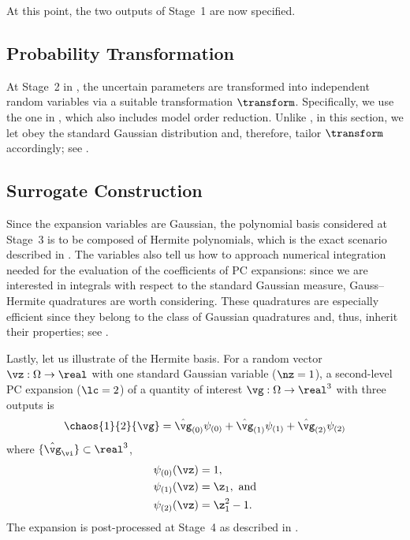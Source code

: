 At this point, the two outputs of Stage~1 are now specified.

\subsection{Probability Transformation}

At Stage~2 in , the uncertain parameters \vu are
transformed into independent random variables \vz via a suitable transformation
$\transform$. Specifically, we use the one in ,
which also includes model order reduction. Unlike
, in this section, we let \vz obey the
standard Gaussian distribution and, therefore, tailor $\transform$ accordingly;
see .

\subsection{Surrogate Construction}

Since the expansion variables \vz are Gaussian, the polynomial basis considered
at Stage~3 is to be composed of Hermite polynomials, which is the exact scenario
described in . The variables also tell us how to approach
numerical integration needed for the evaluation of the coefficients of \ac{PC}
expansions: since we are interested in integrals with respect to the standard
Gaussian measure, Gauss--Hermite quadratures \cite{maitre2010} are worth
considering. These quadratures are especially efficient since they belong to the
class of Gaussian quadratures and, thus, inherit their properties; see
.

Lastly, let us illustrate of the Hermite basis. For a random vector $\vz: \Omega
\to \real$ with one standard Gaussian variable ($\nz = 1$), a second-level
\ac{PC} expansion ($\lc = 2$) of a quantity of interest $\vg: \Omega \to
\real^3$ with three outputs is
\[
  \chaos{1}{2}{\vg}
  = \hat{\vg}_{(0)} \psi_{(0)}
  + \hat{\vg}_{(1)} \psi_{(1)}
  + \hat{\vg}_{(2)} \psi_{(2)}
\]
where $\{ \hat{\vg}_{\vi} \} \subset \real^3$,
\begin{align*}
  & \psi_{(0)}(\vz) = 1, \\
  & \psi_{(1)}(\vz) = \z_1, \text{ and} \\
  & \psi_{(2)}(\vz) = \z_1^2 - 1.
\end{align*}
The expansion is post-processed at Stage~4 as described in
.

